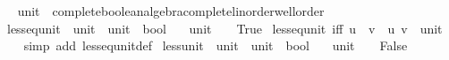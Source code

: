 \begin{isabellebody}
\isamarkupfalse%
%
\isadelimproof
\ %
\endisadelimproof
%
\isatagproof
\isacommand{{\isachardot}{\kern0pt}{\isachardot}{\kern0pt}}\isamarkupfalse%
%
\endisatagproof
{\isafoldproof}%
%
\isadelimproof
%
\endisadelimproof
\isanewline
\isanewline
{}\isamarkupfalse%
\isanewline
\isanewline
{}\isamarkupfalse%
\ unit\ {\isacharcolon}{\kern0pt}{\isacharcolon}{\kern0pt}\ {\isachardoublequoteopen}{\isacharbraceleft}{\kern0pt}complete{\isacharunderscore}{\kern0pt}boolean{\isacharunderscore}{\kern0pt}algebra{\isacharcomma}{\kern0pt}complete{\isacharunderscore}{\kern0pt}linorder{\isacharcomma}{\kern0pt}wellorder{\isacharbraceright}{\kern0pt}{\isachardoublequoteclose}\isanewline
{}\isanewline
\isanewline
{}\isamarkupfalse%
\ less{\isacharunderscore}{\kern0pt}eq{\isacharunderscore}{\kern0pt}unit\ {\isacharcolon}{\kern0pt}{\isacharcolon}{\kern0pt}\ {\isachardoublequoteopen}unit\ {\isasymRightarrow}\ unit\ {\isasymRightarrow}\ bool{\isachardoublequoteclose}\isanewline
\ \ \ {\isachardoublequoteopen}{\isacharparenleft}{\kern0pt}{\isacharunderscore}{\kern0pt}{\isacharcolon}{\kern0pt}{\isacharcolon}{\kern0pt}unit{\isacharparenright}{\kern0pt}\ {\isasymle}\ {\isacharunderscore}{\kern0pt}\ {\isasymlongleftrightarrow}\ True{\isachardoublequoteclose}\isanewline
\isanewline
{}\isamarkupfalse%
\ less{\isacharunderscore}{\kern0pt}eq{\isacharunderscore}{\kern0pt}unit\ {\isacharbrackleft}{\kern0pt}iff{\isacharbrackright}{\kern0pt}{\isacharcolon}{\kern0pt}\ {\isachardoublequoteopen}u\ {\isasymle}\ v{\isachardoublequoteclose}\ \ u\ v\ {\isacharcolon}{\kern0pt}{\isacharcolon}{\kern0pt}\ unit\isanewline
%
\isadelimproof
\ \ %
\endisadelimproof
%
\isatagproof
{}\isamarkupfalse%
\ {\isacharparenleft}{\kern0pt}simp\ add{\isacharcolon}{\kern0pt}\ less{\isacharunderscore}{\kern0pt}eq{\isacharunderscore}{\kern0pt}unit{\isacharunderscore}{\kern0pt}def{\isacharparenright}{\kern0pt}%
\endisatagproof
{\isafoldproof}%
%
\isadelimproof
\isanewline
%
\endisadelimproof
\isanewline
{}\isamarkupfalse%
\ less{\isacharunderscore}{\kern0pt}unit\ {\isacharcolon}{\kern0pt}{\isacharcolon}{\kern0pt}\ {\isachardoublequoteopen}unit\ {\isasymRightarrow}\ unit\ {\isasymRightarrow}\ bool{\isachardoublequoteclose}\isanewline
\ \ \ {\isachardoublequoteopen}{\isacharparenleft}{\kern0pt}{\isacharunderscore}{\kern0pt}{\isacharcolon}{\kern0pt}{\isacharcolon}{\kern0pt}unit{\isacharparenright}{\kern0pt}\ {\isacharless}{\kern0pt}\ {\isacharunderscore}{\kern0pt}\ {\isasymlongleftrightarrow}\ False{\isachardoublequoteclose}\isanewline

\end{isabellebody}
